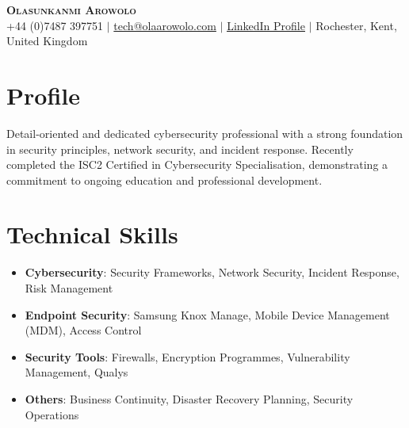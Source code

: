 \documentclass[a4paper,11pt]{article}
\newcommand{\resumeItem}[1]{
  \item\small{
    {#1 \vspace{-2pt}}
  }
}
\newcommand{\resumeItemListStart}{\begin{itemize}}
\newcommand{\resumeItemListEnd}{\end{itemize}\vspace{-5pt}}
\begin{document}

\begin{center}
    \textbf{\Huge \scshape Olasunkanmi Arowolo} \\ \vspace{1pt}
    \small +44 (0)7487 397751 $|$ \href{mailto:tech@olaarowolo.com}{{tech@olaarowolo.com}} $|$ 
    \href{https://www.linkedin.com/in/olasunkanmiarowolo/}{{\underline{LinkedIn Profile}}} $|$
    \small Rochester, Kent, United Kingdom
\end{center}

\raggedright


\section{Profile}
\small{Detail-oriented and dedicated cybersecurity professional with a strong foundation in security principles, network security, and incident response. Recently completed the ISC2 Certified in Cybersecurity Specialisation, demonstrating a commitment to ongoing education and professional development.}

\section{Technical Skills}
    \resumeItemListStart
        \resumeItem{\textbf{Cybersecurity}{: Security Frameworks, Network Security, Incident Response, Risk Management}}
        \resumeItem{\textbf{Endpoint Security}{: Samsung Knox Manage, Mobile Device Management (MDM), Access Control}}
        \resumeItem{\textbf{Security Tools}{: Firewalls, Encryption Programmes, Vulnerability Management, Qualys}}
        \resumeItem{\textbf{Others}{: Business Continuity, Disaster Recovery Planning, Security Operations}}
\resumeItemListEnd
\end{document}
